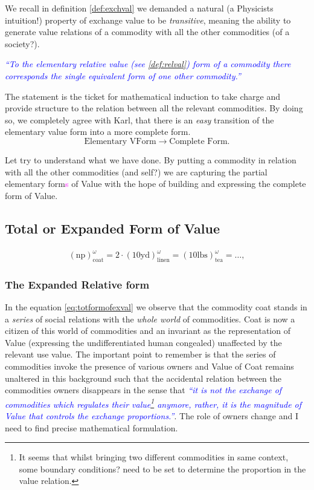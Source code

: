 \documentclass[12pt]{extarticle}
\theoremstyle{definition}
\begin{document}
  We recall in definition \ref{def:exchval} we demanded a natural (a Physicists intuition!) property of exchange value to be \emph{transitive}, meaning the ability to generate value relations of a commodity with all the other commodities (of a society?).

  \textcolor{blue}{\emph{``To the elementary relative value (see \ref{def:relval}) form of a commodity there corresponds the single equivalent form of one other commodity.''}}

  The statement is the ticket for mathematical induction to take charge and provide structure to the relation between all the relevant commodities.  By doing so, we completely agree with Karl, that there is an \emph{easy} transition of the elementary value form into a more complete form.
  \begin{equation}
    \text{Elementary VForm} \rightarrow \text{Complete Form}.
  \end{equation}

  Let try to understand what we have done.  By putting a commodity in relation with all the other commodities (and self?) we are capturing the partial elementary form\textcolor{magenta}{s} of Value with the hope of building and expressing the complete form of Value.

  \subsection{Total or Expanded Form of Value}
  \begin{align}
    \label{eq:totformofexval}
    (\text{np})_{\text{coat}}^{\omega} = 2\cdot (10\text{yd})_{\text{linen}}^{\omega} = (10\text{lbs})_{\text{tea}}^{\omega} = \ldots,
  \end{align}

\subsubsection{The Expanded Relative form}
  
In the equation \ref{eq:totformofexval} we observe that the commodity coat stands in a \emph{series} of social relations with the \emph{whole world} of commodities.  Coat is now a citizen of this world of commodities and an invariant as the representation of Value (expressing the undifferentiated human congealed) unaffected by the relevant use value.  The important point to remember is that the series of commodities invoke the presence of various owners and Value of Coat remains unaltered in this background such that the accidental relation between the commodities owners disappears in the sense that \textcolor{blue}{\emph{``it is not the exchange of commodities which regulates their value\footnote{It seems that whilst bringing two different commodities in same context, some boundary conditions? need to be set to determine the proportion in the value relation.} anymore, rather, it is the magnitude of Value that controls the exchange proportions.''}}.  The role of owners change and I need to find precise mathematical formulation.
\end{document}
